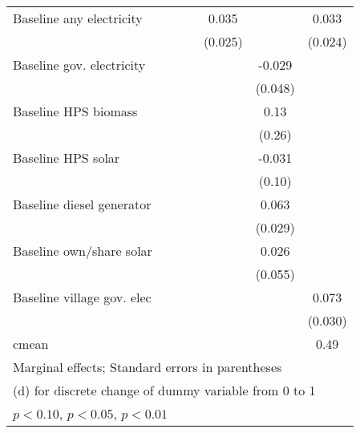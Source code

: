 \begin{table}[htbp]
\begin{tabular*}{1\hsize}{@{\hskip\tabcolsep\extracolsep\fill}l*{6}{c}}
Baseline any electricity&                  &                  &                  &    0.035         &                  &    0.033         \\
                &                  &                  &                  &  (0.025)         &                  &  (0.024)         \\
Baseline gov. electricity&                  &                  &                  &                  &   -0.029         &                  \\
                &                  &                  &                  &                  &  (0.048)         &                  \\
Baseline HPS biomass&                  &                  &                  &                  &     0.13         &                  \\
                &                  &                  &                  &                  &   (0.26)         &                  \\
Baseline HPS solar&                  &                  &                  &                  &   -0.031         &                  \\
                &                  &                  &                  &                  &   (0.10)         &                  \\
Baseline diesel generator&                  &                  &                  &                  &    0.063\sym{**} &                  \\
                &                  &                  &                  &                  &  (0.029)         &                  \\
Baseline own/share solar&                  &                  &                  &                  &    0.026         &                  \\
                &                  &                  &                  &                  &  (0.055)         &                  \\
Baseline village gov. elec&                  &                  &                  &                  &                  &    0.073\sym{**} \\
                &                  &                  &                  &                  &                  &  (0.030)         \\
\midrule
cmean           &                  &                  &                  &                  &                  &     0.49         \\
\bottomrule
\multicolumn{7}{l}{\footnotesize Marginal effects; Standard errors in parentheses}\\
\multicolumn{7}{l}{\footnotesize  (d) for discrete change of dummy variable from 0 to 1}\\
\multicolumn{7}{l}{\footnotesize \sym{*} \(p<0.10\), \sym{**} \(p<0.05\), \sym{***} \(p<0.01\)}\\
\end{tabular*}
\end{table}

